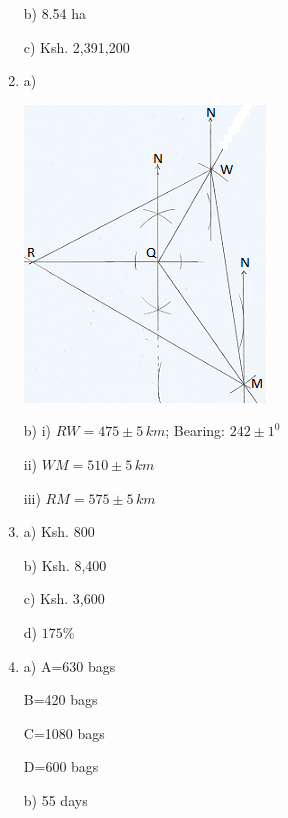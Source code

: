 \documentclass[
  a4paperpaper,
]{scrbook}
\begin{document}
\begin{tcolorbox}
\begin{enumerate}
  b) 8.54 ha

  c) Ksh. 2,391,200
\item
  a)

  \includegraphics{figures/M1N19.png}

  b) i) \(RW=475\pm5\,km\); Bearing: \(242\pm1^0\)

  ii) \(WM=510\pm5\,km\)

  iii) \(RM=575\pm5\,km\)
\item
  a) Ksh. 800

  b) Ksh. 8,400

  c) Ksh. 3,600

  d) \(175\%\)
\item
  a) A=630 bags

  B=420 bags

  C=1080 bags

  D=600 bags

  b) 55 days
\end{enumerate}

\end{tcolorbox}
\end{document}
